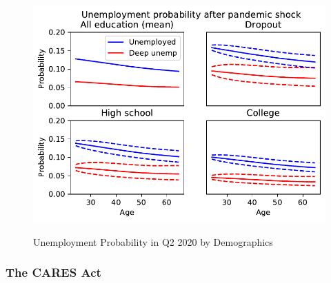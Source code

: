 \documentclass[titlepage,a4paper]{\econtex}
\begin{document}
\begin{figure}
  \centering
  \caption{Unemployment Probability in Q2 2020 by Demographics}
  \label{unemployment_demographics}
  { \includegraphics[width=8in]{./Figures/UnempProbByDemogBasic}}
\end{figure}


\subsubsection{The CARES Act}
\end{document}
